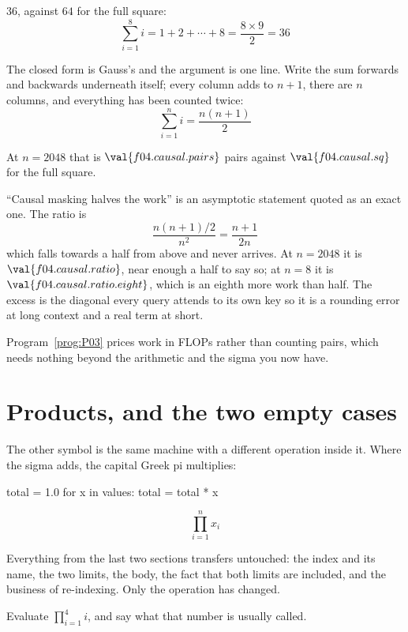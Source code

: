 \begin{fr}
\begin{ansblock}
$36$, against $64$ for the full square:
\[ \sum_{i=1}^{8} i = 1 + 2 + \cdots + 8 = \frac{8 \times 9}{2} = 36 \]
\end{ansblock}

The closed form is Gauss's and the argument is one line. Write the sum
forwards and backwards underneath itself; every column adds to $n + 1$, there
are $n$ columns, and everything has been counted twice:
\[ \sum_{i=1}^{n} i = \frac{n(n+1)}{2} \]

At $n = 2048$ that is $\val{f04.causal.pairs}$ pairs against
$\val{f04.causal.sq}$ for the full square.

\begin{aibox}
\enquote{Causal masking halves the work} is an asymptotic statement quoted as
an exact one. The ratio is
\[ \frac{n(n+1)/2}{n^{2}} = \frac{n+1}{2n} \]
which falls towards a half from above and never arrives. At $n = 2048$ it is
$\val{f04.causal.ratio}$, near enough a half to say so; at $n = 8$ it is
$\val{f04.causal.ratio.eight}$, which is an eighth more work than half. The
excess is the diagonal \dash{} every query attends to its own key \dash{} so
it is a rounding error at long context and a real term at short.

Program~\ref{prog:P03} prices work in FLOPs rather than counting pairs, which
needs nothing beyond the arithmetic and the sigma you now have.
\end{aibox}
\end{fr}


\section{Products, and the two empty cases}
\label{sec:F04-products}

\begin{fr}
The other symbol is the same machine with a different operation inside it.
Where the sigma adds, the capital Greek pi multiplies:

\begin{python}
total = 1.0
for x in values:
    total = total * x
\end{python}

\[ \prod_{i=1}^{n} x_i \]

Everything from the last two sections transfers untouched: the index and its
name, the two limits, the body, the fact that both limits are included, and
the business of re-indexing. Only the operation has changed.

Evaluate $\prod_{i=1}^{4} i$, and say what that number is usually called.
\nextframe
\end{fr}

